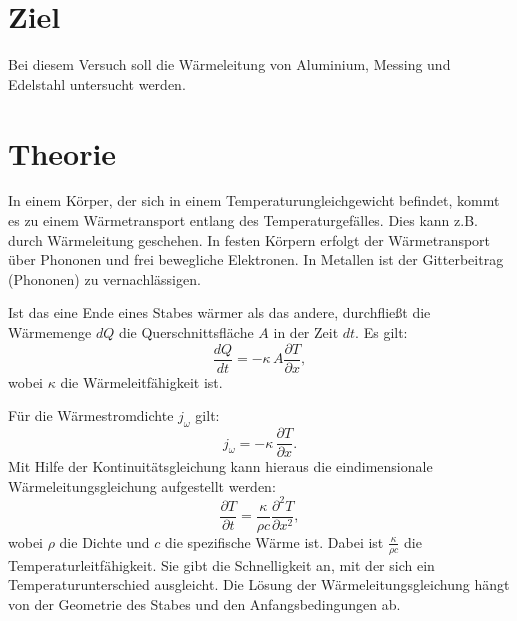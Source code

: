 \section{Ziel}
\label{sec:Ziel}

Bei diesem Versuch soll die Wärmeleitung von Aluminium, Messing und Edelstahl untersucht werden. 

\section{Theorie}
\label{sec:Theorie}

In einem Körper, der sich in einem Temperaturungleichgewicht befindet, kommt es zu einem Wärmetransport entlang 
des Temperaturgefälles. Dies kann z.B. durch Wärmeleitung geschehen. In festen Körpern erfolgt der Wärmetransport 
über Phononen und frei bewegliche Elektronen. In Metallen ist der Gitterbeitrag (Phononen) zu vernachlässigen. 

\noindent Ist das eine Ende eines Stabes wärmer als das andere, durchfließt die Wärmemenge $dQ$ die Querschnittsfläche $A$ in der Zeit $dt$. Es gilt:
\begin{equation}
\frac{dQ}{dt} = -\kappa \, A \frac{\partial T}{\partial x},
\label{eqn:dQ}
\end{equation}
wobei $\kappa$ die Wärmeleitfähigkeit ist.

\noindent Für die Wärmestromdichte $j_{\omega}$ gilt:
\begin{equation*}
    j_{\omega} = -\kappa \, \frac{\partial T}{\partial x}.
\end{equation*}
Mit Hilfe der Kontinuitätsgleichung kann hieraus die eindimensionale Wärmeleitungsgleichung aufgestellt werden:
\begin{equation*}
    \frac{\partial T}{\partial t} = \frac{\kappa}{\rho c} \frac{\partial^2 T}{\partial x^2},
\end{equation*}
wobei $\rho$ die Dichte und $c$ die spezifische Wärme ist.
Dabei ist $\frac{\kappa}{\rho c}$ die Temperaturleitfähigkeit. Sie gibt die Schnelligkeit an, mit der sich ein 
Temperaturunterschied ausgleicht. Die Lösung der Wärmeleitungsgleichung hängt von der Geometrie des Stabes und den Anfangsbedingungen ab. 

